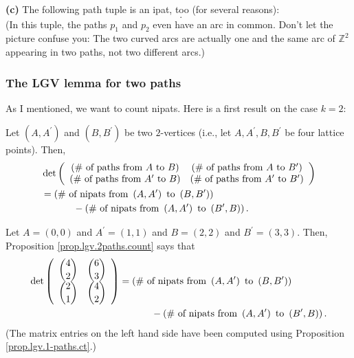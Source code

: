 \begin{definition}
\begin{example}
\textbf{(c)} The following path tuple is an ipat, too (for several reasons):%
\[%
\ \ .
\]
(In this tuple, the paths $p_{1}$ and $p_{2}$ even have an arc in common.
Don't let the picture confuse you: The two curved arcs are actually one and
the same arc of $\mathbb{Z}^{2}$ appearing in two paths, not two different arcs.)
\end{example}

\subsubsection{The LGV lemma for two paths}

As I mentioned, we want to count nipats. Here is a first result on the case
$k=2$:

\begin{proposition}
\label{prop.lgv.2paths.count}Let $\left(
A,A^{\prime}\right)  $ and $\left(  B,B^{\prime}\right)  $ be two $2$-vertices
(i.e., let $A,A^{\prime},B,B^{\prime}$ be four lattice points). Then,%
\begin{align*}
&  \det\left(
\begin{array}
[c]{cc}%
\left(  \text{\# of paths from }A\text{ to }B\right)  & \left(  \text{\# of
paths from }A\text{ to }B^{\prime}\right) \\
\left(  \text{\# of paths from }A^{\prime}\text{ to }B\right)  & \left(
\text{\# of paths from }A^{\prime}\text{ to }B^{\prime}\right)
\end{array}
\right) \\
&  =\left(  \text{\# of nipats from }\left(  A,A^{\prime}\right)  \text{ to
}\left(  B,B^{\prime}\right)  \right) \\
&  \ \ \ \ \ \ \ \ \ \ -\left(  \text{\# of nipats from }\left(  A,A^{\prime
}\right)  \text{ to }\left(  B^{\prime},B\right)  \right)  .
\end{align*}

\end{proposition}

\begin{example}
Let $A=\left(  0,0\right)  $ and $A^{\prime}=\left(  1,1\right)  $ and
$B=\left(  2,2\right)  $ and $B^{\prime}=\left(  3,3\right)  $. Then,
Proposition \ref{prop.lgv.2paths.count} says that%
\begin{align*}
\det\left(
\begin{array}
[c]{cc}%
\dbinom{4}{2} & \dbinom{6}{3}\\
\dbinom{2}{1} & \dbinom{4}{2}%
\end{array}
\right)   &  =\left(  \text{\# of nipats from }\left(  A,A^{\prime}\right)
\text{ to }\left(  B,B^{\prime}\right)  \right) \\
&  \ \ \ \ \ \ \ \ \ \ -\left(  \text{\# of nipats from }\left(  A,A^{\prime
}\right)  \text{ to }\left(  B^{\prime},B\right)  \right)  .
\end{align*}
(The matrix entries on the left hand side have been computed using Proposition
\ref{prop.lgv.1-paths.ct}.)


\end{example}
\end{definition}
